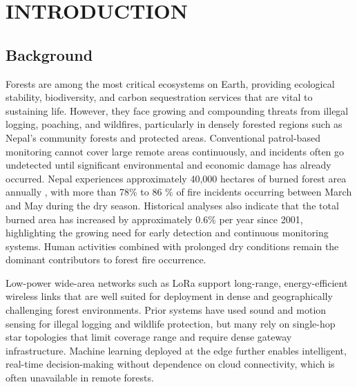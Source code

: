 
\chapter{INTRODUCTION}

\section{Background}
Forests are among the most critical ecosystems on Earth, providing ecological
stability, biodiversity, and carbon sequestration services that are vital to
sustaining life. However, they face growing and compounding threats from illegal
logging, poaching, and wildfires, particularly in densely forested regions such as
Nepal's community forests and protected areas. Conventional patrol-based monitoring
cannot cover large remote areas continuously, and incidents often go undetected
until significant environmental and economic damage has already occurred.
Nepal experiences approximately 40,000 hectares of burned forest area annually \cite{matinUnderstandingForestFire2017}\cite{mishraForestFirePattern2023}, with more than 78\% to 86 \% of fire incidents occurring between March and May during the dry season\cite{bhattaraiAnticipatoryForestfireRisk2026}. Historical analyses also indicate that the total burned area has increased by approximately 0.6\% per year since 2001, highlighting the growing need for early detection and continuous monitoring systems. Human activities combined with prolonged dry conditions remain the dominant contributors to forest fire occurrence.

Low-power wide-area networks such as LoRa support long-range, energy-efficient
wireless links that are well suited for deployment in dense and geographically
challenging forest environments. Prior systems have used sound and motion sensing
for illegal logging and wildlife protection, but many rely on single-hop star
topologies that limit coverage range and require dense gateway infrastructure.
Machine learning deployed at the edge further enables intelligent, real-time
decision-making without dependence on cloud connectivity, which is often
unavailable in remote forests.

